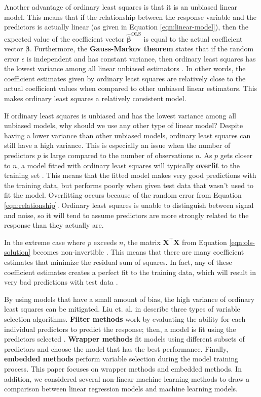 \documentclass{article}
\begin{document}
	Another advantage of ordinary least squares is that it is an unbiased linear model. This means that if the relationship between the response variable and the predictors is actually linear (as given in Equation \ref{eqn:linear-model}), then the expected value of the coefficient vector $\hat{\bm{\beta}}^\text{OLS}$ is equal to the actual coefficient vector $\bm{\beta}$. Furthermore, the \textbf{Gauss-Markov theorem} states that if the random error $\epsilon$ is independent and has constant variance, then ordinary least squares has the lowest variance among all linear unbiased estimators \cite{greene2003econometric, friedman2001elements}. In other words, the coefficient estimates given by ordinary least squares are relatively close to the actual coefficient values when compared to other unbiased linear estimators. This makes ordinary least squares a relatively consistent model.
	
	If ordinary least squares is unbiased and has the lowest variance among all unbiased models, why should we use any other type of linear model? Despite having a lower variance than other unbiased models, ordinary least squares can still have a high variance. This is especially an issue when the number of predictors $p$ is large compared to the number of observations $n$. As $p$ gets closer to $n$, a model fitted with ordinary least squares will typically \textbf{overfit} to the training set \cite{james2013introduction, friedman2001elements}. This means that the fitted model makes very good predictions with the training data, but performs poorly when given test data that wasn't used to fit the model. Overfitting occurs because of the random error from Equation \ref{eqn:relationship}. Ordinary least squares is unable to distinguish between signal and noise, so it will tend to assume predictors are more strongly related to the response than they actually are.
	
	In the extreme case where $p$ exceeds $n$, the matrix $\mathbf{X}^\top \mathbf{X}$ from Equation \ref{eqn:ols-solution} becomes non-invertible \cite{friedman2001elements}. This means that there are many coefficient estimates that minimize the residual sum of squares. In fact, any of these coefficient estimates creates a perfect fit to the training data, which will result in very bad predictions with test data \cite{james2013introduction}.
	
	By using models that have a small amount of bias, the high variance of ordinary least squares can be mitigated. Liu et. al. in \cite{liu2020logsum} describe three types of variable selection algorithms. \textbf{Filter methods} work by evaluating the ability for each individual predictors to predict the response; then, a model is fit using the predictors selected \cite{sanchez2007filter, ding2005minimum}. \textbf{Wrapper methods} fit models using different subsets of predictors and choose the model that has the best performance. Finally, \textbf{embedded methods} perform variable selection during the model training process. This paper focuses on wrapper methods and embedded methods. In addition, we considered several non-linear machine learning methods to draw a comparison between linear regression models and machine learning models.
	
\end{document}
